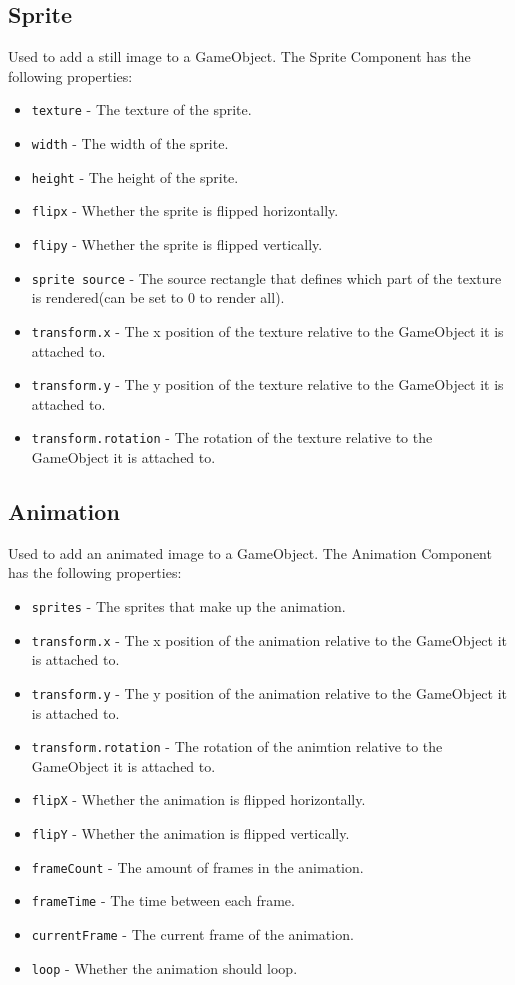 \subsection{Sprite}
Used to add a still image to a GameObject.
The Sprite Component has the following properties:
\begin{itemize}
    \item \texttt{texture} - The texture of the sprite.
    \item \texttt{width} - The width of the sprite.
    \item \texttt{height} - The height of the sprite.
    \item \texttt{flipx} - Whether the sprite is flipped horizontally.
    \item \texttt{flipy} - Whether the sprite is flipped vertically.
    \item \texttt{sprite source} - The source rectangle that defines which part of the texture is rendered(can be set to 0 to render all).
    \item \texttt{transform.x} - The x position of the texture relative to the GameObject it is attached to.
    \item \texttt{transform.y} - The y position of the texture relative to the GameObject it is attached to.
    \item \texttt{transform.rotation} - The rotation of the texture relative to the GameObject it is attached to.
\end{itemize}

\subsection{Animation}
Used to add an animated image to a GameObject.
The Animation Component has the following properties:
\begin{itemize}
    \item \texttt{sprites} - The sprites that make up the animation.
    \item \texttt{transform.x} - The x position of the animation relative to the GameObject it is attached to.
    \item \texttt{transform.y} - The y position of the animation relative to the GameObject it is attached to.
    \item \texttt{transform.rotation} - The rotation of the animtion relative to the GameObject it is attached to.
    \item \texttt{flipX} - Whether the animation is flipped horizontally.
    \item \texttt{flipY} - Whether the animation is flipped vertically.
    \item \texttt{frameCount} - The amount of frames in the animation.
    \item \texttt{frameTime} - The time between each frame.
    \item \texttt{currentFrame} - The current frame of the animation.
    \item \texttt{loop} - Whether the animation should loop.
\end{itemize}

